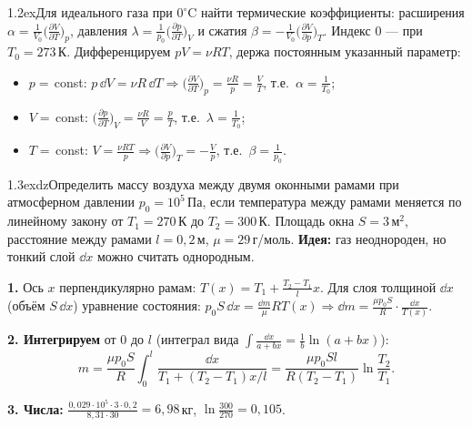 \begin{problem}{1.2}{ex}{Для идеального газа при $0^\circ$C найти термические коэффициенты: расширения $\alpha=\frac1{V_0}\big(\frac{\partial V}{\partial T}\big)_p$,
давления $\lambda=\frac1{p_0}\big(\frac{\partial p}{\partial T}\big)_V$ и сжатия $\beta=-\frac1{V_0}\big(\frac{\partial V}{\partial p}\big)_T$. Индекс 0 — при $T_0=273$\,К.}
Дифференцируем $pV=\nu RT$, держа постоянным указанный параметр:
\begin{itemize}
\item $p=$\,const: $p\,\dd V=\nu R\,\dd T\Rightarrow\big(\frac{\partial V}{\partial T}\big)_p=\frac{\nu R}{p}=\frac{V}{T}$, т.е.\ $\alpha=\frac1{T_0}$;
\item $V=$\,const: $\big(\frac{\partial p}{\partial T}\big)_V=\frac{\nu R}{V}=\frac pT$, т.е.\ $\lambda=\frac1{T_0}$;
\item $T=$\,const: $V=\frac{\nu RT}p\Rightarrow\big(\frac{\partial V}{\partial p}\big)_T=-\frac{V}{p}$, т.е.\ $\beta=\frac1{p_0}$.
\end{itemize}
\end{problem}

\begin{problem}{1.3}{exdz}{Определить массу воздуха между двумя оконными рамами при атмосферном давлении $p_0=10^5$\,Па, если температура между рамами
меняется по линейному закону от $T_1=270$\,К до $T_2=300$\,К. Площадь окна $S=3$\,м$^2$, расстояние между рамами $l=0{,}2$\,м, $\mu=29$\,г/моль.}
\textbf{Идея:} газ неоднороден, но тонкий слой $\dd x$ можно считать однородным.

\textbf{1.} Ось $x$ перпендикулярно рамам: $T(x)=T_1+\frac{T_2-T_1}{l}x$. Для слоя толщиной $\dd x$ (объём $S\,\dd x$) уравнение состояния:
$p_0S\,\dd x=\frac{\dd m}{\mu}RT(x)\Rightarrow\dd m=\frac{\mu p_0S}{R}\cdot\frac{\dd x}{T(x)}$.

\textbf{2. Интегрируем} от 0 до $l$ (интеграл вида $\int\frac{\dd x}{a+bx}=\frac1b\ln(a+bx)$):
\[m=\frac{\mu p_0S}{R}\int_0^l\frac{\dd x}{T_1+(T_2-T_1)x/l}=\frac{\mu p_0Sl}{R(T_2-T_1)}\ln\frac{T_2}{T_1}.\]

\textbf{3. Числа:} $\frac{0{,}029\cdot10^5\cdot3\cdot0{,}2}{8{,}31\cdot30}=6{,}98$\,кг, $\ln\frac{300}{270}=0{,}105$.
\end{problem}

